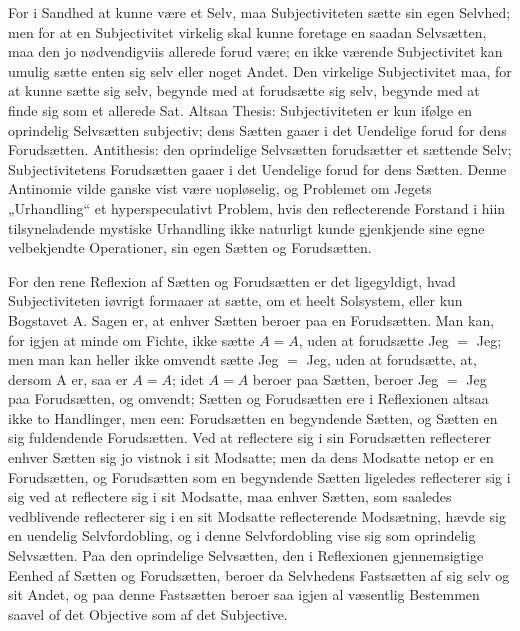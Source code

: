\documentclass[11pt]{book}
\newcommand{\opage}[1]{\marginnote{\footnotesize\textit{[#1]}}}
\begin{document}
For i Sandhed at kunne være et Selv, maa Subjectiviteten sætte sin egen
Selvhed; men for at en Subjectivitet virkelig skal kunne foretage en saadan
Selvsætten, maa den jo nødvendigviis allerede forud være; en ikke værende
Subjectivitet kan umulig sætte enten sig selv eller noget Andet. Den
virkelige Subjectivitet maa, for at kunne sætte sig selv, begynde med at
forudsætte sig selv, begynde med at finde sig som et allerede Sat. Altsaa
Thesis: Subjectiviteten er kun ifølge en oprindelig Selvsætten subjectiv;
dens Sætten gaaer i det Uendelige forud for dens Forudsætten. Antithesis:
den oprindelige Selvsætten forudsætter et sættende Selv; Subjectivitetens
Forudsætten gaaer i det Uendelige forud for dens Sætten. Denne Antinomie
vilde ganske vist være uopløselig, og Problemet om Jegets „Urhandling“ et
hyperspeculativt Problem, hvis den reflecterende Forstand i hiin
tilsyneladende mystiske Urhandling ikke naturligt kunde gjenkjende sine
egne velbekjendte Operationer, sin egen Sætten og Forudsætten.

For den rene Reflexion af Sætten og Forudsætten er det ligegyldigt, hvad
Subjectiviteten iøvrigt formaaer at sætte, om et heelt Solsystem, eller kun
Bogstavet A. Sagen er, at enhver Sætten beroer paa en Forudsætten. Man kan,
for igjen at minde om Fichte, ikke sætte $A = A$, uden at forudsætte Jeg
$=$ Jeg; men man kan heller ikke omvendt sætte Jeg $=$ Jeg, uden at
forudsætte, at, dersom A er, saa er $A = A$; idet $A = A$ beroer paa
Sætten, beroer Jeg $=$ Jeg paa Forudsætten, og omvendt; Sætten og
Forudsætten ere i Reflexionen altsaa ikke to Handlinger, men een:
Forudsætten en begyndende Sætten, og Sætten en sig fuldendende
Forudsætten. Ved at reflectere sig i sin Forudsætten reflecterer enhver
Sætten sig jo vistnok i sit Modsatte; men da dens
\opage{66} \setcounter{footnote}{0}%
Modsatte netop er en Forudsætten, og Forudsætten som en begyndende Sætten
ligeledes reflecterer sig i sig ved at reflectere sig i sit Modsatte, maa
enhver Sætten, som saaledes vedblivende reflecterer sig i en sit Modsatte
reflecterende Modsætning, hævde sig en uendelig Selvfordobling, og i denne
Selvfordobling vise sig som oprindelig Selvsætten. Paa den oprindelige
Selvsætten, den i Reflexionen gjennemsigtige Eenhed af Sætten og
Forudsætten, beroer da Selvhedens Fastsætten af sig selv og sit Andet, og
paa denne Fastsætten beroer saa igjen al væsentlig Bestemmen saavel of det
Objective som af det Subjective.
\end{document}
